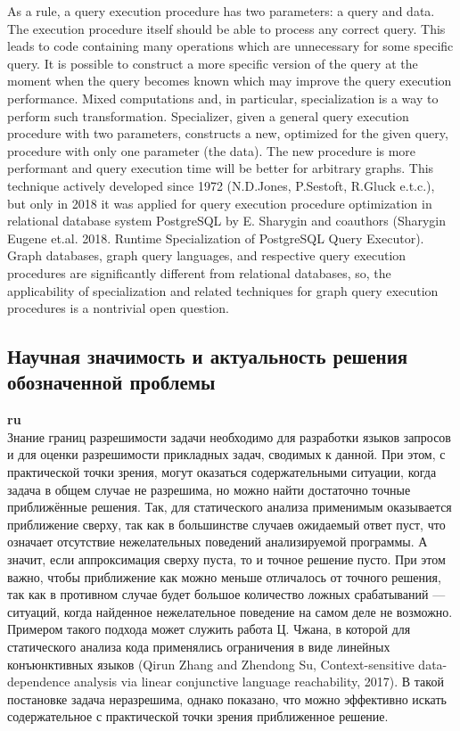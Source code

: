 \documentclass[12pt]{article}  %
\theoremstyle{remark}
\begin{document}
As a rule, a query execution procedure has two parameters: a query and data.
The execution procedure itself should be able to process any correct query.
This leads to code containing many operations which are unnecessary for some specific query.
It is possible to construct a more specific version of the query at the moment when the query becomes known which may improve the query execution performance.
Mixed computations and, in particular, specialization is a way to perform such transformation.
Specializer, given a general query execution procedure with two parameters, constructs a new, optimized for the given query, procedure with only one parameter (the data). The new procedure is more performant and query execution time will be better for arbitrary graphs.
This technique actively developed since 1972 (N.D.Jones, P.Sestoft, R.Gluck e.t.c.), but only in 2018 it was applied for query execution procedure optimization in relational database system PostgreSQL by E. Sharygin and coauthors (Sharygin Eugene et.al. 2018. Runtime Specialization of PostgreSQL Query Executor). Graph databases, graph query languages, and respective query execution procedures are significantly different from relational databases, so, the applicability of specialization and related techniques for graph query execution procedures is a nontrivial open question.

\subsection{Научная значимость и актуальность решения обозначенной проблемы}

\textbf{ru}\\
%
Знание границ разрешимости задачи необходимо для разработки языков запросов и для оценки разрешимости прикладных задач, сводимых к данной.
При этом, с практической точки зрения, могут оказаться содержательными ситуации, когда задача в общем случае не разрешима, но можно найти достаточно точные приближённые решения.
Так, для статического анализа применимым  оказывается приближение сверху, так как в большинстве случаев ожидаемый ответ пуст, что означает отсутствие нежелательных поведений анализируемой программы.
А значит, если аппроксимация сверху пуста, то и точное решение пусто.
При этом важно, чтобы приближение как можно меньше отличалось от точного решения, так как в противном случае будет большое количество ложных срабатываний --- ситуаций, когда найденное нежелательное поведение на самом деле не возможно.
Примером такого подхода может служить работа Ц. Чжана, в которой для статического анализа кода применялись ограничения в виде линейных конъюнктивных языков (Qirun Zhang and Zhendong Su, Context-sensitive data-dependence analysis via linear conjunctive language reachability, 2017). В такой постановке задача неразрешима, однако показано, что можно эффективно искать содержательное с практической точки зрения приближенное решение.
\end{document}

